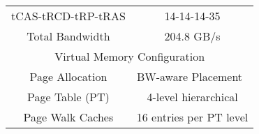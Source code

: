\begin {table}[h]
\begin{center}
\begin{tabular}{|c|c|}
     \small{tCAS-tRCD-tRP-tRAS}   &  14-14-14-35     \\ 
     Total Bandwidth      &  204.8 GB/s               \\ \hline
     \multicolumn{2}{|c|}{Virtual Memory Configuration}     \\ \hline
     Page Allocation      &  BW-aware Placement~\cite{batman,bwa}  \\ 
     Page Table (PT)      &  4-level hierarchical    \\ 
     Page Walk Caches     &  16 entries per PT level       \\ \hline

\end{tabular}
\label{table:method_system}
\vspace{-0.3in}
\end{center}
\normalsize
\end{table}
